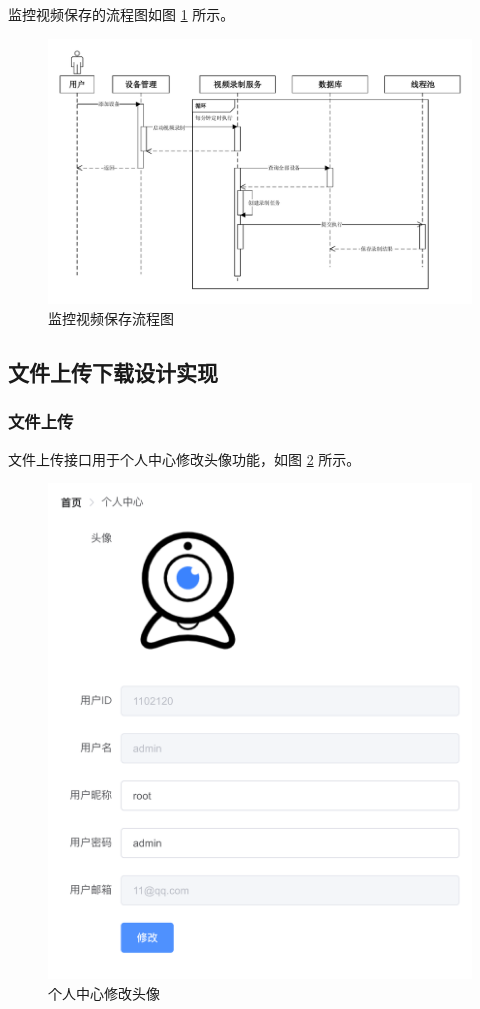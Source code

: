 监控视频保存的流程图如图 \ref{Fig:video_save} 所示。

\begin{figure}[ht]
    \centering
    \includegraphics[width=0.9\linewidth]{./Figure/IMG_video_save.pdf}
    \caption{监控视频保存流程图}\label{Fig:video_save}
\end{figure}

\subsection{文件上传下载设计实现}
\subsubsection{文件上传}
文件上传接口用于个人中心修改头像功能，如图 \ref{Fig:file_upload} 所示。

\begin{figure}[ht]
    \centering
    \includegraphics[width=0.9\linewidth]{./Figure/IMG_file_upload.png}
    \caption{个人中心修改头像}\label{Fig:file_upload}
\end{figure}

